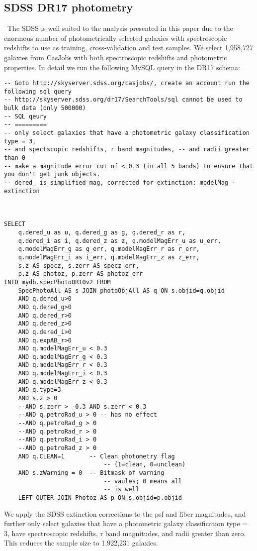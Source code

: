 \subsection{SDSS DR17 photometry}\
The SDSS is well suited to the analysis presented in this paper due to the enormous number of photometrically selected galaxies with spectroscopic redshifts to use as training, cross-validation and test samples. We select 1,958,727 galaxies from CasJobs with both spectroscopic redshifts and photometric properties. In detail we run the following MySQL query in the DR17 schema:
\begin{verbatim}
-- Goto http://skyserver.sdss.org/casjobs/, create an account run the following sql query
-- http://skyserver.sdss.org/dr17/SearchTools/sql cannot be used to bulk data (only 500000)
-- SQL qeury
-- =========
-- only select galaxies that have a photometric galaxy classification type = 3, 
-- and spectscopic redshifts, r band magnitudes, -- and radii greater than 0
-- make a magnitude error cut of < 0.3 (in all 5 bands) to ensure that you don't get junk objects.
-- dered_ is simplified mag, corrected for extinction: modelMag - extinction	



SELECT
    q.dered_u as u, q.dered_g as g, q.dered_r as r, 
    q.dered_i as i, q.dered_z as z, q.modelMagErr_u as u_err, 
    q.modelMagErr_g as g_err, q.modelMagErr_r as r_err, 
    q.modelMagErr_i as i_err, q.modelMagErr_z as z_err,
    s.z AS specz, s.zerr AS specz_err,
    p.z AS photoz, p.zerr AS photoz_err
INTO mydb.specPhotoDR10v2 FROM 
	SpecPhotoAll AS s JOIN photoObjAll AS q ON s.objid=q.objid
	AND q.dered_u>0
	AND q.dered_g>0
	AND q.dered_r>0
	AND q.dered_z>0
	AND q.dered_i>0
	AND q.expAB_r>0
	AND q.modelMagErr_u < 0.3
	AND q.modelMagErr_g < 0.3
	AND q.modelMagErr_r < 0.3
	AND q.modelMagErr_i < 0.3
	AND q.modelMagErr_z < 0.3
	AND q.type=3
	AND s.z > 0
	--AND s.zerr > -0.3 AND s.zerr < 0.3
	--AND q.petroRad_u > 0 -- has no effect
	--AND q.petroRad_g > 0
	--AND q.petroRad_r > 0
	--AND q.petroRad_i > 0
	--AND q.petroRad_z > 0
	AND q.CLEAN=1 		-- Clean photometry flag
							-- (1=clean, 0=unclean)
	AND s.zWarning = 0 	-- Bitmask of warning
							-- vaules; 0 means all
							-- is well
	LEFT OUTER JOIN Photoz AS p ON s.objid=p.objid
\end{verbatim}

We apply the SDSS extinction corrections to the psf and fiber magnitudes, and further only select galaxies that have a photometric galaxy classification type = 3, have spectroscopic redshifts, r band magnitudes, and radii greater than zero. This reduces the sample size to 1,922,231 galaxies.